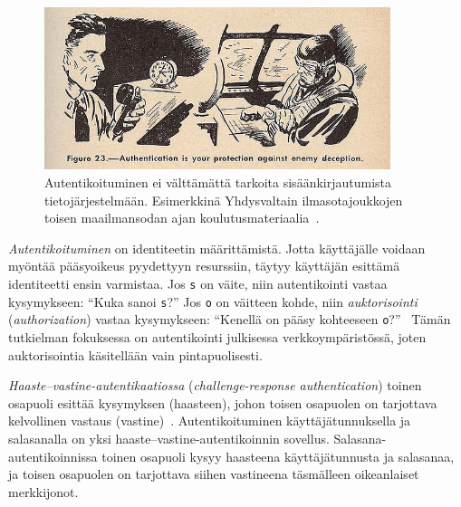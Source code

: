 \documentclass[finnish,gradu]{tktltiki}
\begin{document}
  \begin{figure}[h!]
    \centering
    \includegraphics[width=0.9\textwidth]{images/usnavy_authentication.jpg}
    \caption{Autentikoituminen ei välttämättä tarkoita sisäänkirjautumista tietojärjestelmään. Esimerkkinä Yhdysvaltain ilmasotajoukkojen toisen maailmansodan ajan koulutusmateriaalia~\cite{usnavy_authentication}.}
    \label{fig:autentikointi_suojaa_viholliselta}
  \end{figure}


  \emph{Autentikoituminen} on identiteetin määrittämistä. Jotta käyttäjälle voidaan myöntää pääsyoikeus pyydettyyn resurssiin, täytyy käyttäjän esittämä identiteetti ensin varmistaa. Jos \verb#s# on väite, niin autentikointi vastaa kysymykseen: ``Kuka sanoi \verb#s#?'' Jos \verb#o# on väitteen kohde, niin \emph{auktorisointi} (\emph{authorization}) vastaa kysymykseen: ``Kenellä on pääsy kohteeseen \verb#o#?''~\cite{lampson_distributed_1992} Tämän tutkielman fokuksessa on autentikointi julkisessa verkkoympäristössä, joten auktorisointia käsitellään vain pintapuolisesti.

  \emph{Haaste--vastine-autentikaatiossa} (\emph{challenge-response authentication}) toinen osapuoli esittää kysymyksen (haasteen), johon toisen osapuolen on tarjottava kelvollinen vastaus (vastine)~\cite{NIST_SP800-63-1}. Autentikoituminen käyttäjätunnuksella ja salasanalla on yksi haaste--vastine-autentikoinnin sovellus. Salasana-autentikoinnissa toinen osapuoli kysyy haasteena käyttäjätunnusta ja salasanaa, ja toisen osapuolen on tarjottava siihen vastineena täsmälleen oikeanlaiset merkkijonot.


\end{document}
